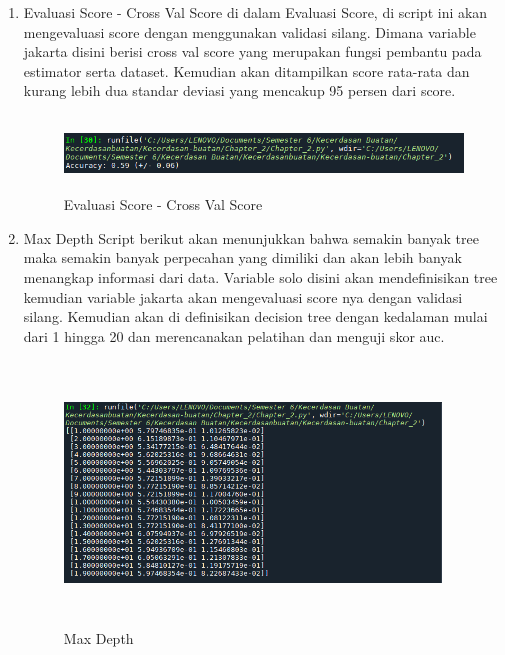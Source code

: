 \begin{enumerate}
\item Evaluasi Score - Cross Val Score
\newline di dalam Evaluasi Score, di script ini akan mengevaluasi score dengan menggunakan validasi silang. Dimana variable jakarta disini berisi cross val score yang merupakan fungsi pembantu pada estimator serta dataset. Kemudian akan ditampilkan score rata-rata dan kurang lebih dua standar deviasi yang mencakup 95 persen dari score.
\begin{figure}[!htbp]
	\centering
	\includegraphics[width=14cm,height=2cm]{figures/Cp2-h.png}
	\caption{Evaluasi Score - Cross Val Score}
	\label{penanda}
\end{figure}

\item Max Depth
\newline Script berikut akan menunjukkan bahwa semakin banyak tree maka semakin banyak perpecahan yang dimiliki dan akan lebih banyak menangkap informasi dari data. Variable solo disini akan mendefinisikan tree kemudian variable jakarta akan mengevaluasi score nya dengan validasi silang. Kemudian akan di definisikan decision tree dengan kedalaman mulai dari 1 hingga 20 dan
merencanakan pelatihan dan menguji skor auc.
\begin{figure}[!htbp]
	\centering
	\includegraphics[width=10cm,height=7cm]{figures/Cp2-i.png}
	\caption{Max Depth}
	\label{penanda}
\end{figure}


\end{enumerate}
